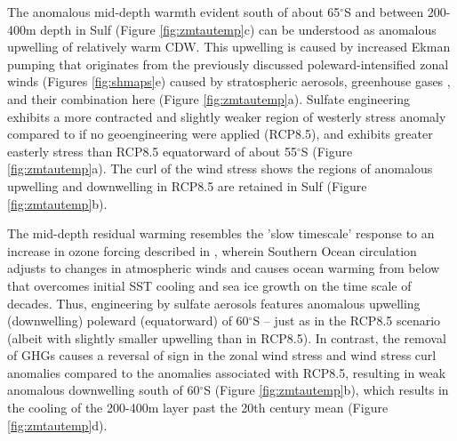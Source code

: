 \documentclass{nature}
\begin{document}
The anomalous mid-depth warmth evident south of about 65$^\circ$S and between 200-400m depth in Sulf (Figure \ref{fig:zmtautemp}c) can be understood as anomalous upwelling of relatively warm CDW. This upwelling is caused by increased Ekman pumping that originates from the previously discussed poleward-intensified zonal winds (Figures \ref{fig:shmaps}e) caused by stratospheric aerosols, greenhouse gases \cite{fyfe07}, and their combination here (Figure \ref{fig:zmtautemp}a). Sulfate engineering exhibits a more contracted and slightly weaker region of westerly stress anomaly compared to if no geoengineering were applied (RCP8.5), and exhibits greater easterly stress than RCP8.5 equatorward of about 55$^\circ$S (Figure \ref{fig:zmtautemp}a). The curl of the wind stress shows the regions of anomalous upwelling and downwelling in RCP8.5 are retained in Sulf (Figure \ref{fig:zmtautemp}b). %

The mid-depth residual warming resembles the 'slow timescale' response to an increase in ozone forcing described in \cite{ferreira14}, wherein Southern Ocean circulation adjusts to changes in atmospheric winds and causes ocean warming from below that overcomes initial SST cooling and sea ice growth on the time scale of decades. Thus, engineering by sulfate aerosols features anomalous upwelling (downwelling) poleward (equatorward) of 60$^\circ$S -- just as in the RCP8.5 scenario (albeit with slightly smaller upwelling than in RCP8.5). In contrast, the removal of GHGs causes a reversal of sign in the zonal wind stress and wind stress curl anomalies compared to the anomalies associated with RCP8.5, resulting in weak anomalous downwelling south of 60$^\circ$S (Figure \ref{fig:zmtautemp}b), which results in the cooling of the 200-400m layer past the 20th century mean (Figure \ref{fig:zmtautemp}d). %
\end{document}
